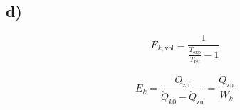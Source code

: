 

\subsection*{d)}
\[
E_{k, \text{vol}} = \frac{1}{\frac{T_{\text{exp}}}{T_{\text{ref}}} - 1}
\]

\[
E_{k} = \frac{\dot{Q}_{\text{zu}}}{\dot{Q}_{k0} - \dot{Q}_{\text{zu}}} = \frac{\dot{Q}_{\text{zu}}}{W_{k}}
\]